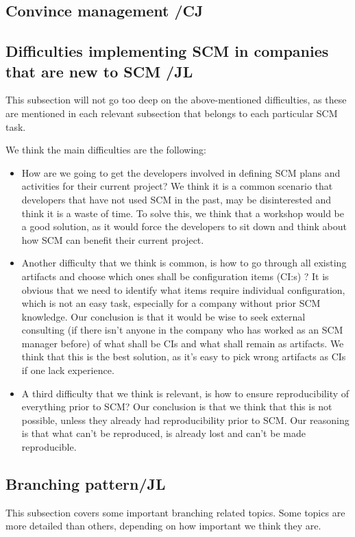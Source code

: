 \documentclass[10pt]{article}
\begin{document}
\subsection{Convince management /CJ}
\subsection{Difficulties implementing SCM in companies that are new to SCM /JL}
This subsection will not go too deep on the above-mentioned difficulties, as these are mentioned in each relevant subsection that belongs to each particular SCM task.

We think the main difficulties are the following:
\begin{itemize}
\item How are we going to get the developers involved in defining SCM plans and activities for their current project? We think it is a common scenario that developers that have not used SCM in the past, may be disinterested and think it is a waste of time. To solve this, we think that a workshop \cite{Vinter} would be a good solution, as it would force the developers to sit down and think about how SCM can benefit their current project.

\item Another difficulty that we think is common, is how to go through all existing artifacts and choose which ones shall be configuration items (CI:s) \cite{Kelly2}? It is obvious that we need to identify what items require individual configuration, which is not an easy task, especially for a company without prior SCM knowledge. Our conclusion is that it would be wise to seek external consulting (if there isn't anyone in the company who has worked as an SCM manager before) of what shall be CIs and what shall remain as artifacts. We think that this is the best solution, as it's easy to pick wrong artifacts as CIs if one lack experience.

\item A third difficulty that we think is relevant, is how to ensure reproducibility of everything prior to SCM? Our conclusion is that we think that this is not possible, unless they already had reproducibility prior to SCM. Our reasoning is that what can't be reproduced, is already lost and can't be made reproducible. 

\end{itemize}
\subsection{Branching pattern/JL}
This subsection covers some important branching related topics. Some topics are more detailed than others, depending on how important we think they are.
\end{document}
